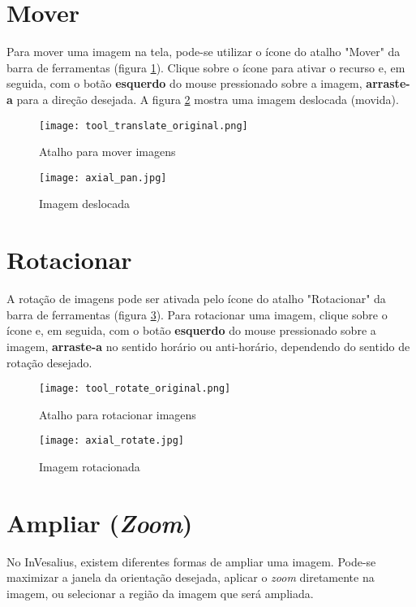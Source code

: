 \section{Mover}

Para mover uma imagem na tela, pode-se utilizar o ícone do atalho "Mover" da barra de ferramentas (figura
\ref{fig:move_icon}). Clique sobre o ícone para ativar o recurso e, em seguida, com o botão
\textbf{esquerdo} do mouse pressionado sobre a imagem, \textbf{arraste-a} para a direção desejada.
A figura \ref{fig:move_img} mostra uma imagem deslocada (movida).

\begin{figure}[!htb]
\centering
\texttt{[image: tool\_translate\_original.png]}
\caption{Atalho para mover imagens}
\label{fig:move_icon}
\end{figure}

\begin{figure}[!htb]
\centering
\texttt{[image: axial\_pan.jpg]}
\caption{Imagem deslocada}
\label{fig:move_img}
\end{figure}

\section{Rotacionar}

A rotação de imagens pode ser ativada pelo ícone do atalho "Rotacionar" da barra de ferramentas (figura
\ref{fig:rot_icon}). Para rotacionar uma imagem, clique sobre o ícone e, em seguida, com o botão
\textbf{esquerdo} do mouse pressionado sobre a imagem, \textbf{arraste-a} no sentido horário ou
anti-horário, dependendo do sentido de rotação desejado.

\begin{figure}[!htb]
\centering
\texttt{[image: tool\_rotate\_original.png]}
\caption{Atalho para rotacionar imagens}
\label{fig:rot_icon}
\end{figure}

\begin{figure}[!htb]
\centering
\texttt{[image: axial\_rotate.jpg]}
\caption{Imagem rotacionada}
\label{fig:rotate_all}
\end{figure}

\section{Ampliar (\textit{Zoom})}

No InVesalius, existem diferentes formas de ampliar uma imagem. Pode-se maximizar a janela da
orientação desejada, aplicar o \textit{zoom} diretamente na imagem, ou selecionar a região da imagem
que será ampliada.


